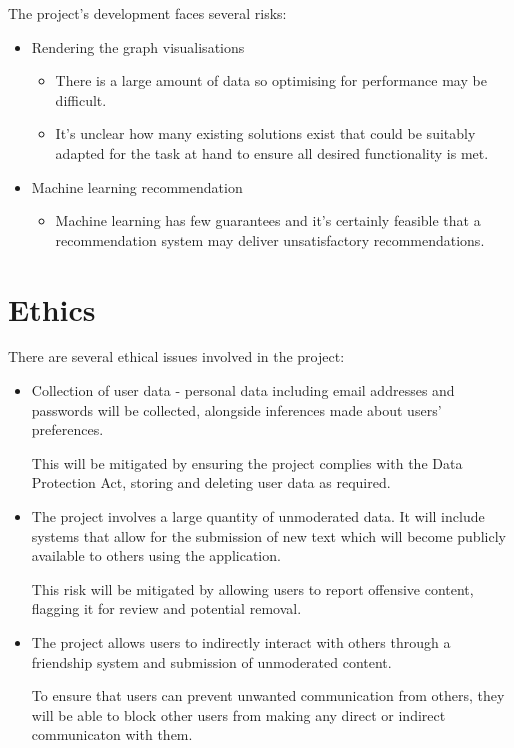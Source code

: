 The project's development faces several risks:
\begin{itemize}
    \item Rendering the graph visualisations
        \begin{itemize}
            \item There is a large amount of data so optimising for performance may be difficult.
            \item It's unclear how many existing solutions exist that could be suitably adapted for the task at hand to ensure all desired functionality is met.
        \end{itemize}
    \item Machine learning recommendation
        \begin{itemize}
            \item Machine learning has few guarantees and it's certainly feasible that a recommendation system may deliver unsatisfactory recommendations.
        \end{itemize}
\end{itemize}

%
%
\section{Ethics}

There are several ethical issues involved in the project:
\begin{itemize}
\item Collection of user data - personal data including email addresses and passwords will be collected, alongside inferences made about users' preferences.

This will be mitigated by ensuring the project complies with the Data Protection Act, storing and deleting user data as required. 
\item The project involves a large quantity of unmoderated data. It will include systems that allow for the submission of new text which will become publicly available to others using the application. 

This risk will be mitigated by allowing users to report offensive content, flagging it for review and potential removal.
\item The project allows users to indirectly interact with others through a friendship system and submission of unmoderated content.

To ensure that users can prevent unwanted communication from others, they will be able to block other users from making any direct or indirect communicaton with them.
\end{itemize}